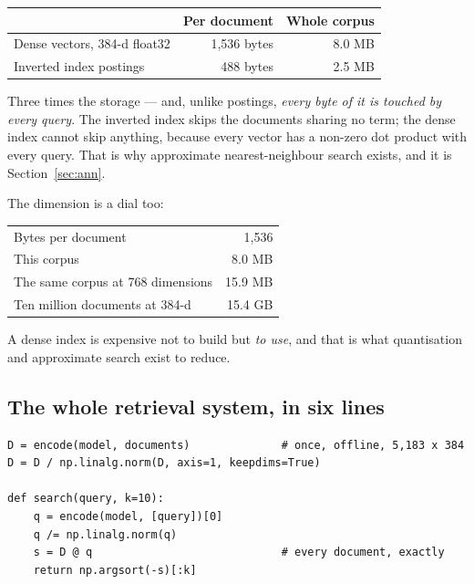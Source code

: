 \documentclass[11pt,a4paper]{article}
\begin{document}
\begin{center}
\small
\begin{tabular}{lrr}
\toprule
 & \textbf{Per document} & \textbf{Whole corpus} \\
\midrule
Dense vectors, 384-d float32 & 1{,}536 bytes & 8.0 MB \\
Inverted index postings      & 488 bytes    & 2.5 MB \\
\bottomrule
\end{tabular}
\end{center}

Three times the storage --- and, unlike postings, \emph{every byte of it is
touched by every query}. The inverted index skips the documents sharing no
term; the dense index cannot skip anything, because every vector has a non-zero
dot product with every query. That is why approximate nearest-neighbour search
exists, and it is Section~\ref{sec:ann}.

The dimension is a dial too:

\begin{center}
\small
\begin{tabular}{lr}
\toprule
Bytes per document                        & 1{,}536 \\
This corpus                               & 8.0 MB \\
The same corpus at 768 dimensions         & 15.9 MB \\
Ten million documents at 384-d            & 15.4 GB \\
\bottomrule
\end{tabular}
\end{center}

A dense index is expensive not to build but \emph{to use}, and that is what
quantisation and approximate search exist to reduce.

\subsection{The whole retrieval system, in six lines}

\begin{verbatim}
D = encode(model, documents)              # once, offline, 5,183 x 384
D = D / np.linalg.norm(D, axis=1, keepdims=True)

def search(query, k=10):
    q = encode(model, [query])[0]
    q /= np.linalg.norm(q)
    s = D @ q                             # every document, exactly
    return np.argsort(-s)[:k]
\end{verbatim}
\end{document}
